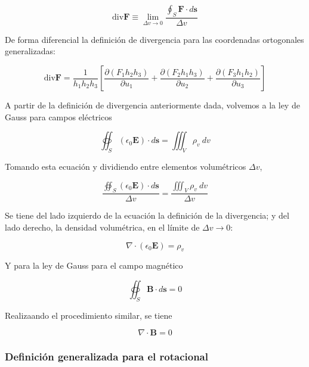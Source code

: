 \begin{equation*}
\text{div} \mathbf{F} \equiv \lim_{\Delta v \to 0} \frac{\oint_S \mathbf{F} \cdot d \mathbf{s}}{\Delta v}
\end{equation*}

De forma diferencial la definición de divergencia para las coordenadas ortogonales generalizadas:

\begin{equation*}
\text{div} \mathbf{F} = \frac{1}{h_1 h_2 h_3} \left[ \frac{\partial (F_1h_2h_3) }{\partial u_1 } + \frac{\partial (F_2h_1h_3) }{\partial u_2 } + \frac{\partial (F_3h_1h_2) }{\partial u_3 } \right]
\end{equation*}

A partir de la definición de divergencia anteriormente dada, volvemos a la ley de Gauss para campos eléctricos

\begin{equation*}
\oiint_S \left( \epsilon_0 \mathbf{E} \right) \cdot d \mathbf{s} = \iiint_V \rho_v \ dv
\end{equation*}

Tomando esta ecuación y dividiendo entre elementos volumétricos $\Delta v$,

\begin{equation*}
\frac{\oiint_S \left( \epsilon_0 \mathbf{E} \right) \cdot d \mathbf{s}}{\Delta v} = \frac{\iiint_V \rho_v \ dv}{\Delta v}
\end{equation*}

Se tiene del lado izquierdo de la ecuación la definición de la divergencia; y del lado derecho, la densidad volumétrica, en el límite de $\Delta v \to 0$:

\begin{equation*}
\nabla \cdot ( \epsilon_0 \mathbf{E} ) = \rho_v 
\end{equation*}

Y para la ley de Gauss para el campo magnético

\begin{equation*}
\oiint_S \mathbf{B} \cdot d \mathbf{s} = 0
\end{equation*}

Realizaando el procedimiento similar, se tiene

\begin{equation*}
\nabla \cdot \mathbf{B} = 0
\end{equation*}


\subsubsection{Definición generalizada para el rotacional}

